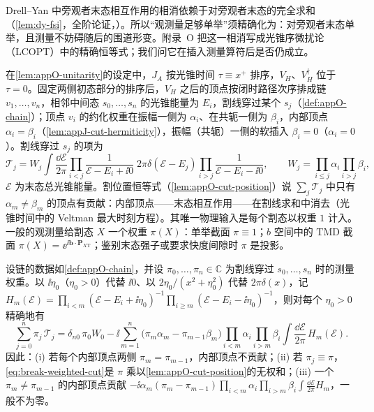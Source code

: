 Drell--Yan 中旁观者末态相互作用的相消依赖于对旁观者末态的完全求和（\cref{lem:dy-fsi}，全阶论证，\tagA）。所以“观测量足够单举”须精确化为：对旁观者末态单举，且测量不妨碍随后的围道形变。附录~O 把这一相消写成光锥序微扰论（LCOPT）中的精确恒等式；我们问它在插入测量算符后是否仍成立。

在\cref{lem:appO-unitarity}的设定中，$J_A$ 按光锥时间 $\tau\equiv x^+$ 排序，$V_H$、$V_H^\dagger$ 位于 $\tau=0$。固定两侧初态部分的排序后，$V_H$ 之后的顶点按闭时路径次序排成链 $v_1,\dots,v_n$，相邻中间态 $s_0,\dots,s_n$ 的光锥能量为 $E_i$，割线穿过某个 $s_j$（\cref{def:appO-chain}）；顶点 $v_i$ 的约化权重在振幅一侧为 $\alpha_i$、在共轭一侧为 $\beta_i$，内部顶点 $\alpha_i=\beta_i$（\cref{lem:appJ-cut-hermiticity}），振幅（共轭）一侧的软插入 $\beta_i=0$（$\alpha_i=0$）。割线穿过 $s_j$ 的项为
\begin{equation}\label{eq:break-Tj}
\mathcal T_j=W_j\int\frac{\dd\mathcal E}{2\pi}\prod_{i<j}\frac{1}{\mathcal E-E_i+\ii0}\;2\pi\delta(\mathcal E-E_j)\prod_{i>j}\frac{1}{\mathcal E-E_i-\ii0},\qquad W_j=\prod_{i\le j}\alpha_i\prod_{i>j}\beta_i ,
\end{equation}
$\mathcal E$ 为末态总光锥能量。割位置恒等式（\cref{lem:appO-cut-position}）说 $\sum_j\mathcal T_j$ 中只有 $\alpha_m\neq\beta_m$ 的顶点有贡献：内部顶点——末态相互作用——在割线求和中消去（光锥时间中的 Veltman 最大时刻方程\cite{Veltman1963}）。其唯一物理输入是每个割态以权重 $1$ 计入。一般的观测量给割态 $X$ 一个权重 $\pi(X)$：单举截面 $\pi\equiv1$；$b$ 空间中的 TMD 截面 $\pi(X)=\ee^{\ii\boldsymbol b\cdot\boldsymbol P_{X\mathrm T}}$；鉴别末态强子或要求快度间隙时 $\pi$ 是投影。

\begin{lemma}[带测量权重的割位置恒等式]\label{lem:break-weighted-cut}
设链的数据如\cref{def:appO-chain}，并设 $\pi_0,\dots,\pi_n\in\mathbb C$ 为割线穿过 $s_0,\dots,s_n$ 时的测量权重。以 $\ii\eta_0$（$\eta_0>0$）代替 $\ii0$、以 $2\eta_0/(x^2+\eta_0^2)$ 代替 $2\pi\delta(x)$，记 $H_m(\mathcal E)=\prod_{i<m}(\mathcal E-E_i+\ii\eta_0)^{-1}\prod_{i\ge m}(\mathcal E-E_i-\ii\eta_0)^{-1}$，则对每个 $\eta_0>0$ 精确地有
\begin{equation}\label{eq:break-weighted-cut}
\sum_{j=0}^n\pi_j\,\mathcal T_j=\delta_{n0}\,\pi_0W_0-\ii\sum_{m=1}^n\big(\pi_m\alpha_m-\pi_{m-1}\beta_m\big)\prod_{i<m}\alpha_i\prod_{i>m}\beta_i\int\frac{\dd\mathcal E}{2\pi}\,H_m(\mathcal E).
\end{equation}
因此：(i) 若每个内部顶点两侧 $\pi_m=\pi_{m-1}$，内部顶点不贡献；(ii) 若 $\pi_j\equiv\pi$，\cref{eq:break-weighted-cut}是 $\pi$ 乘以\cref{lem:appO-cut-position}的无权和；(iii) 一个 $\pi_m\neq\pi_{m-1}$ 的内部顶点贡献 $-\ii\alpha_m(\pi_m-\pi_{m-1})\prod_{i<m}\alpha_i\prod_{i>m}\beta_i\int\frac{\dd\mathcal E}{2\pi}H_m$，一般不为零。
\end{lemma}

